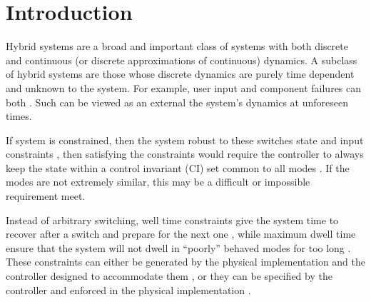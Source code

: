 \section{Introduction}
Hybrid systems are a broad and important class of systems with both discrete and continuous (or discrete approximations of continuous) dynamics. A subclass of hybrid systems are those whose discrete dynamics are purely time dependent and unknown to the system. For example, user input and component failures can both . Such  can be viewed as an external  the system's dynamics at unforeseen times. 

If  system is constrained, then the system  robust to these switches  state and input constraints , then satisfying the constraints would require the controller to always keep the state within a control invariant (CI) set common to all modes \cite{Liberzon1999, Blanchini1999}. If the modes are not extremely similar, this may be a difficult or impossible requirement meet. 

Instead of arbitrary switching,  well time constraints give the system time to recover after a switch and prepare for the next one \cite{Danielson2019,Lavaei2021}, while maximum dwell time ensure that the system will not dwell in ``poorly'' behaved modes for too long \cite{Hall2022}. These constraints can either be generated by the physical implementation and the controller designed to accommodate them \cite{Danielson2019}, or they can be specified by the controller and enforced in the physical implementation \cite{Zhang2016}. 

